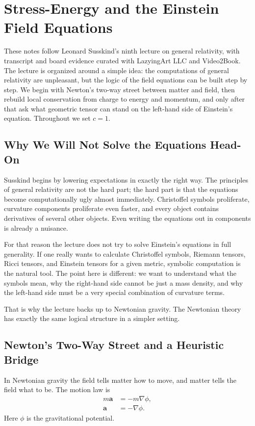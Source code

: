 \chapter{Stress-Energy and the Einstein Field Equations}

These notes follow Leonard Susskind's ninth lecture on general relativity, with transcript and board evidence curated with LazyingArt LLC and Video2Book. The lecture is organized around a simple idea: the computations of general relativity are unpleasant, but the logic of the field equations can be built step by step. We begin with Newton's two-way street between matter and field, then rebuild local conservation from charge to energy and momentum, and only after that ask what geometric tensor can stand on the left-hand side of Einstein's equation. Throughout we set \(c=1\).

\section{Why We Will Not Solve the Equations Head-On}

Susskind begins by lowering expectations in exactly the right way. The principles of general relativity are not the hard part; the hard part is that the equations become computationally ugly almost immediately. Christoffel symbols proliferate, curvature components proliferate even faster, and every object contains derivatives of several other objects. Even writing the equations out in components is already a nuisance.

For that reason the lecture does not try to solve Einstein's equations in full generality. If one really wants to calculate Christoffel symbols, Riemann tensors, Ricci tensors, and Einstein tensors for a given metric, symbolic computation is the natural tool. The point here is different: we want to understand what the symbols mean, why the right-hand side cannot be just a mass density, and why the left-hand side must be a very special combination of curvature terms.

That is why the lecture backs up to Newtonian gravity. The Newtonian theory has exactly the same logical structure in a simpler setting.

\section{Newton's Two-Way Street and a Heuristic Bridge}

In Newtonian gravity the field tells matter how to move, and matter tells the field what to be. The motion law is
\begin{align}
m\mathbf a &= -m\nabla\phi,\\
\mathbf a &= -\nabla\phi.
\end{align}
Here \(\phi\) is the gravitational potential.

